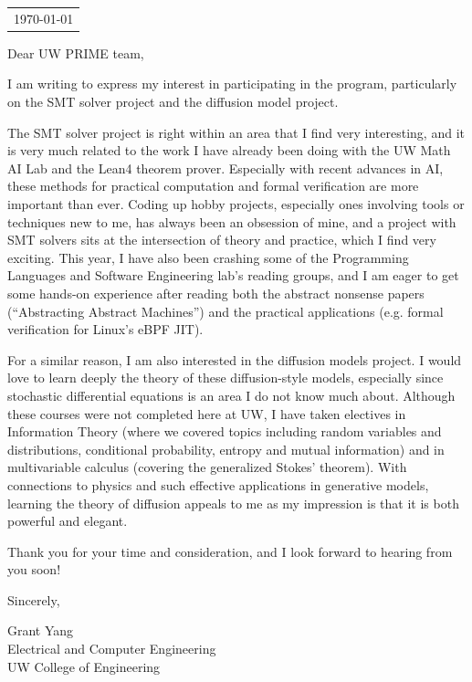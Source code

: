\documentclass[letterpaper,12pt]{article}
\begin{document}
\begin{minipage}[c]{1\textwidth}
    \raggedleft
    \begin{tabular}{r}
        \today
    \end{tabular}
\end{minipage}

\noindent Dear UW PRIME team,



I am writing to express my interest in participating in the program, particularly on the SMT solver project and the diffusion model project.

The SMT solver project is right within an area that I find very interesting, and it is very much related to the work I have already been doing with the UW Math AI Lab and the Lean4 theorem prover. Especially with recent advances in AI, these methods for practical computation and formal verification are more important than ever. Coding up hobby projects, especially ones involving tools or techniques new to me, has always been an obsession of mine, and a project with SMT solvers sits at the intersection of theory and practice, which I find very exciting. This year, I have also been crashing some of the Programming Languages and Software Engineering lab's reading groups, and I am eager to get some hands-on experience after reading both the abstract nonsense papers (``Abstracting Abstract Machines'') and the practical applications (e.g. formal verification for Linux's eBPF JIT).

For a similar reason, I am also interested in the diffusion models project. I would love to learn deeply the theory of these diffusion-style models, especially since stochastic differential equations is an area I do not know much about. Although these courses were not completed here at UW, I have taken electives in Information Theory (where we covered topics including random variables and distributions, conditional probability, entropy and mutual information) and in multivariable calculus (covering the generalized Stokes' theorem). With connections to physics and such effective applications in generative models, learning the theory of diffusion appeals to me as my impression is that it is both powerful and elegant.

Thank you for your time and consideration, and I look forward to hearing from you soon!


\vspace{1.5em}
\noindent Sincerely,

\noindent Grant Yang \\
Electrical and Computer Engineering \\
UW College of Engineering \\
\end{document}
